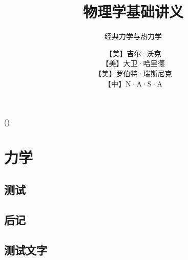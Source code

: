 \documentclass[themecolor=brown]{textbook-cn}
\title{物理学基础讲义}
\subtitle{经典力学与热力学}
\author{【美】吉尔·沃克\\【美】大卫·哈里德\\【美】罗伯特·瑞斯尼克\\【中】N·A·S·A}
\begin{document}
\MainFont

%

\maketitle

\lipsum[1-6]



\frontmatter
\lipsum


\shorttableofcontents
\tableofcontents

\listoffigures


\cleardoublepage

\lipsum[2]

(\firstrightxmark)
%
\mainmatter


\partintro{\lipsum[2]}
\part[短标题]{力学}
\lipsum


%

%

%
%
%
%
%
%
%
%
%
%
%
%
%
\chapter{测试}
\zhlipsum[1]

\backmatter

%	


\chapter{后记}

\lipsum




\chapter{测试文字}
\zhlipsum
\end{document}
